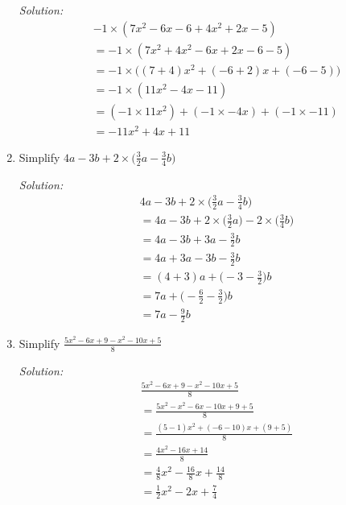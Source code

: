 \documentclass[16pt]{article}
\theoremstyle{remark}
\begin{document}
\begin{enumerate}
\begin{mdframed}[style=TheoremFrame]
\textit{Solution:}
\begin{align*}
&-1\times(7x^2-6x-6+4x^2+2x-5)\\
&= -1 \times (7x^2 + 4x^2 -6x + 2x -6 - 5)\\
&= -1 \times \big( (7+4)x^2 + (-6+2)x + (-6-5)\big)\\
&= -1 \times ( 11x^2 -4x - 11 )\\
&= (-1 \times 11x^2) + (-1 \times -4x) + (-1\times -11)\\
&= -11x^2 + 4x + 11
\end{align*}
\end{mdframed}
\item Simplify $\displaystyle{4a-3b + 2\times\bigg(\frac{3}{2}a -\frac{3}{4}b\bigg)}$
\begin{mdframed}[style=TheoremFrame]
\textit{Solution:}
\begin{align*}
&4a-3b + 2\times\bigg(\frac{3}{2}a -\frac{3}{4}b\bigg)\\
&= 4a-3b + 2\times\bigg(\frac{3}{2}a\bigg) - 2\times \bigg(\frac{3}{4}b\bigg)\\
&= 4a - 3b + 3a - \frac{3}{2}b\\
&= 4a+3a - 3b - \frac{3}{2}b\\
&= (4+3)a + \bigg(-3-\frac{3}{2}\bigg)b\\
&= 7a + \bigg(-\frac{6}{2}-\frac{3}{2}\bigg)b\\
&= 7a -\frac{9}{2}b
\end{align*}
\end{mdframed}
\newpage
\item Simplify $\displaystyle{\frac{5x^2-6x+9-x^2-10x+5}{8}}$
\begin{mdframed}[style=TheoremFrame]
\textit{Solution:}
\begin{align*}
&\frac{5x^2-6x+9-x^2-10x+5}{8}\\[2ex]
&= \frac{5x^2-x^2-6x-10x+9+5}{8}\\[2ex]
&= \frac{(5-1)x^2+(-6-10)x+(9+5)}{8}\\[2ex]
&= \frac{4x^2-16x+14}{8}\\[2ex]
&= \frac{4}{8}x^2-\frac{16}{8}x + \frac{14}{8}\\[2ex]
&= \frac{1}{2}x^2 -2x + \frac{7}{4}
\end{align*}
\end{mdframed}
\end{enumerate}
\end{document}
